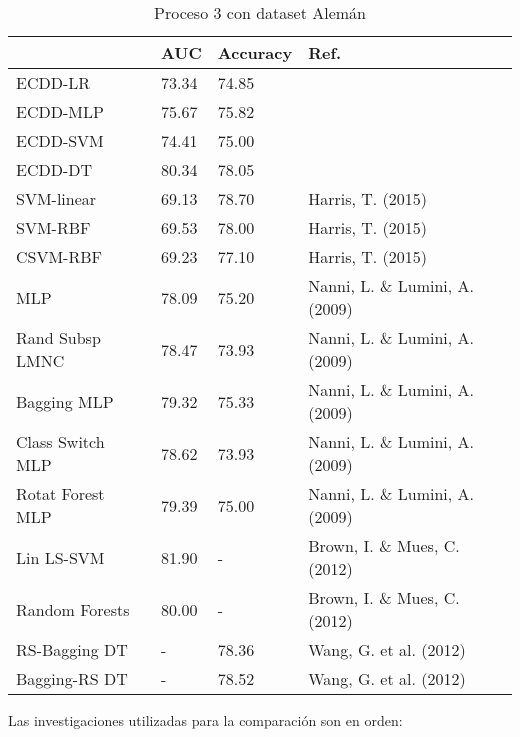 \begin{table}[]
\centering
\caption{Proceso 3 con dataset Alemán}
\label{tab:german-proc3}
\begin{tabularx}{\textwidth}{|l|Y Y l|}
                        \hline
                        & AUC       & Accuracy  & Ref.                                  \\
                        \hline
ECDD-LR                   & 73.34     & 74.85     &                                       \\
ECDD-MLP                  & 75.67     & 75.82     &                                       \\
ECDD-SVM                  & 74.41     & 75.00     &                                       \\
ECDD-DT                   & 80.34     & 78.05     &                                       \\
                        \hline
SVM-linear              & 69.13     & 78.70     & Harris, T. (2015)                     \\
SVM-RBF                 & 69.53     & 78.00     & Harris, T. (2015)                     \\
CSVM-RBF                & 69.23     & 77.10     & Harris, T. (2015)                     \\
MLP                     & 78.09     & 75.20     & Nanni, L. \& Lumini, A. (2009)        \\
Rand Subsp LMNC         & 78.47     & 73.93     & Nanni, L. \& Lumini, A. (2009)        \\
Bagging MLP             & 79.32     & 75.33     & Nanni, L. \& Lumini, A. (2009)        \\
Class Switch MLP        & 78.62     & 73.93     & Nanni, L. \& Lumini, A. (2009)        \\
Rotat Forest MLP        & 79.39     & 75.00     & Nanni, L. \& Lumini, A. (2009)        \\
Lin LS-SVM              & 81.90     & -         & Brown, I. \& Mues, C. (2012)          \\
Random Forests          & 80.00     & -         & Brown, I. \& Mues, C. (2012)          \\
RS-Bagging DT           & -         & 78.36     & Wang, G. et al. (2012)                \\
Bagging-RS DT           & -         & 78.52     & Wang, G. et al. (2012)                \\
                        \hline
\end{tabularx}
\par
\small
Las investigaciones utilizadas para la comparación son en orden: \cite{harris2015credit, nanni2009experimental, brown2012experimental, wang2012two}
\end{table}

